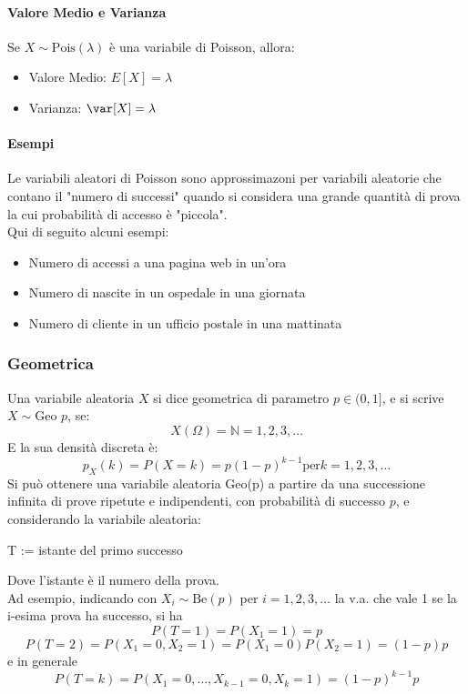 	\paragraph{Valore Medio e Varianza}
	Se $X \sim \text{Pois}(\lambda)$ è una variabile di Poisson, allora:
	\begin{itemize}
		\item Valore Medio: $E[X] = \lambda$
		\item Varianza: $\var[X] = \lambda$
	\end{itemize}

	\paragraph{Esempi}
	Le variabili aleatori di Poisson sono approssimazoni per variabili aleatorie che contano il "numero di successi"
	quando si considera una grande quantità di prova la cui probabilità di accesso è "piccola".
	\\ Qui di seguito alcuni esempi:
	\begin{itemize}
		\item Numero di accessi a una pagina web in un'ora
		\item Numero di nascite in un ospedale in una giornata
		\item Numero di cliente in un ufficio postale in una mattinata
	\end{itemize}

	\subsubsection{Geometrica}
	Una variabile aleatoria $X$ si dice geometrica di parametro $p \in (0,1]$, e si scrive
$X \sim \text{Geo }p$, se:
	\[X(\Omega)=\mathbb{N} = {1,2,3,\dots}\]
	E la sua densità discreta è:
	\[
		p_X (k) = P(X = k) = p(1-p)^{k-1} \text{per} k=1,2,3,\dots
	\]
	Si può ottenere una variabile aleatoria Geo(p) a partire da una successione infinita di prove ripetute
	e indipendenti, con probabilità di successo $p$, e considerando la variabile aleatoria:
	\begin{center}
		T := istante del primo successo
	\end{center}
	Dove l'istante è il numero della prova.
	\\ Ad esempio, indicando con $X_i \sim \text{Be}(p)$ per $i=1,2,3,\dots$ la v.a. che vale 1
	se la i-esima prova ha successo, si ha
	\[
		P(T=1) = P(X_1 = 1) = p
	\]
	\[
		P(T=2) = P(X_1 = 0, X_2 = 1) = P(X_1 = 0)P(X_2 = 1) = (1-p)p
	\]
	e in generale
	\[
		P(T=k) = P(X_1=0, \dots, X_{k-1} = 0, X_k = 1) = (1-p)^{k-1}p
	\]

